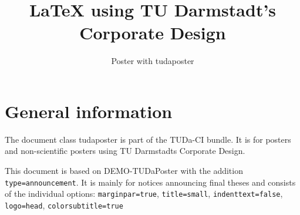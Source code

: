 \documentclass[
	english,%
	paper=a4,%
	accentcolor=9c,%
	type=announcement,
	footer=true,
]{tudaposter}
\newcommand*{\code}[1]{\texttt{#1}}
\begin{document}
\title{\LaTeX{} using TU Darmstadt's Corporate Design}
\subtitle{Poster with tudaposter}

\maketitle

\section*{General information}

The document class tudaposter is part of the TUDa-CI bundle. It is for posters and non-scientific posters using TU Darmstadts Corporate Design.

This document is based on DEMO-TUDaPoster with the addition \code{type=announcement}.
It is mainly for notices announcing final theses and consists of the individual options: \code{marginpar=true}, \code{title=small}, \code{indenttext=false}, \code{logo=head}, \code{colorsubtitle=true}
\end{document}
